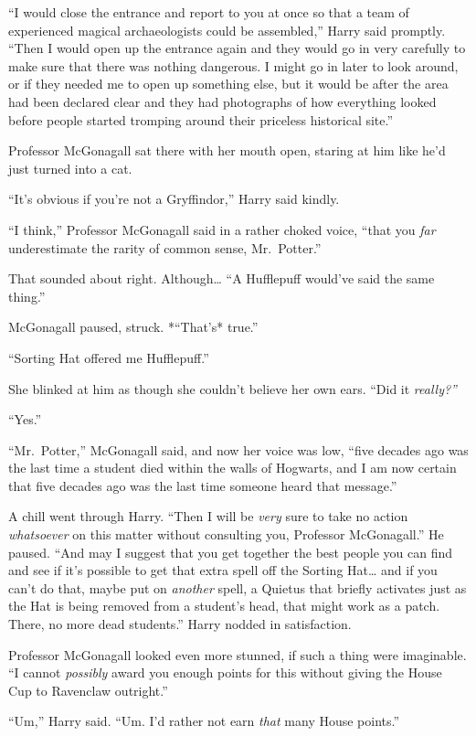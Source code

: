 ``I would close the entrance and report to you at once so that a team of
experienced magical archaeologists could be assembled,'' Harry said
promptly. ``Then I would open up the entrance again and they would go in
very carefully to make sure that there was nothing dangerous. I might go
in later to look around, or if they needed me to open up something else,
but it would be after the area had been declared clear and they had
photographs of how everything looked before people started tromping
around their priceless historical site.''

Professor McGonagall sat there with her mouth open, staring at him like
he'd just turned into a cat.

``It's obvious if you're not a Gryffindor,'' Harry said kindly.

``I think,'' Professor McGonagall said in a rather choked voice, ``that
you \emph{far} underestimate the rarity of common sense, Mr.~Potter.''

That sounded about right. Although\ldots{} ``A Hufflepuff would've said
the same thing.''

McGonagall paused, struck. *``That's* true.''

``Sorting Hat offered me Hufflepuff.''

She blinked at him as though she couldn't believe her own ears. ``Did it
\emph{really?''}

``Yes.''

``Mr.~Potter,'' McGonagall said, and now her voice was low, ``five
decades ago was the last time a student died within the walls of
Hogwarts, and I am now certain that five decades ago was the last time
someone heard that message.''

A chill went through Harry. ``Then I will be \emph{very} sure to take no
action \emph{whatsoever} on this matter without consulting you,
Professor McGonagall.'' He paused. ``And may I suggest that you get
together the best people you can find and see if it's possible to get
that extra spell off the Sorting Hat\ldots{} and if you can't do that,
maybe put on \emph{another} spell, a Quietus that briefly activates just
as the Hat is being removed from a student's head, that might work as a
patch. There, no more dead students.'' Harry nodded in satisfaction.

Professor McGonagall looked even more stunned, if such a thing were
imaginable. ``I cannot \emph{possibly} award you enough points for this
without giving the House Cup to Ravenclaw outright.''

``Um,'' Harry said. ``Um. I'd rather not earn \emph{that} many House
points.''

